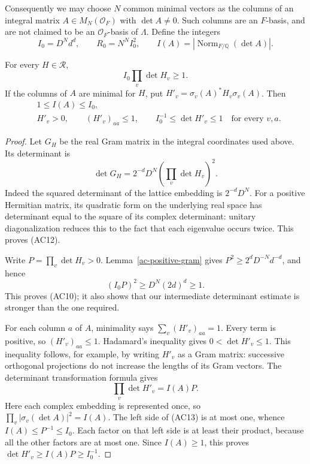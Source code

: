 Consequently we may choose $N$ common minimal vectors as the
columns of an integral matrix $A\in M_N(\mathcal O_F)$ with
$\det A\ne0$.  Such columns are an $F$-basis, and are not
claimed to be an $\mathcal O_F$-basis of $\Lambda$.
Define the integers
\[
       I_0=D^N d^d,\qquad R_0=N^N I_0^2,\qquad
       I(A)=|\operatorname{Norm}_{F/\mathbb Q}(\det A)|.
       \tag{AC9}
\]

\begin{lemma}\label{ac-det}
For every $H\in\mathcal R$,
\[
                  I_0\prod_v\det H_v\ge1.
                  \tag{AC10}
\]
If the columns of $A$ are minimal for $H$, put
$H'_v=\sigma_v(A)^*H_v\sigma_v(A)$.  Then
\[
 \begin{split}
 &1\le I(A)\le I_0,\\
 &H'_v>0,\qquad (H'_v)_{aa}\le1,\qquad
                I_0^{-1}\le\det H'_v\le1
                   \quad\text{for every }v,a.
 \end{split}
 \tag{AC11}
\]
\end{lemma}
\begin{proof}
Let $G_H$ be the real Gram matrix in the integral coordinates
used above.  Its determinant is
\[
       \det G_H=2^{-d}D^N\left(\prod_v\det H_v\right)^2.
       \tag{AC12}
\]
Indeed the squared determinant of the lattice embedding is
$2^{-d}D^N$.  For a positive Hermitian matrix, its quadratic
form on the underlying real space has determinant equal to
the square of its complex determinant: unitary diagonalization
reduces this to the fact that each eigenvalue occurs twice.
This proves (AC12).

Write $P=\prod_v\det H_v>0$.
Lemma~\ref{ac-positive-gram} gives
$P^2\ge 2^dD^{-N}d^{-d}$, and hence
\[
                       (I_0P)^2\ge D^N(2d)^d\ge1.
\]
This proves (AC10); it also shows that our intermediate
determinant estimate is stronger than the one required.

For each column $a$ of $A$, minimality says
$\sum_v(H'_v)_{aa}=1$.  Every term is positive, so
$(H'_v)_{aa}\le1$.  Hadamard's inequality gives
$0<\det H'_v\le1$.  This inequality follows, for example,
by writing $H'_v$ as a Gram matrix: successive orthogonal
projections do not increase the lengths of its Gram vectors.
The determinant transformation formula gives
\[
                  \prod_v\det H'_v=I(A)P.
                  \tag{AC13}
\]
Here each complex embedding is represented once, so
$\prod_v|\sigma_v(\det A)|^2=I(A)$.
The left side of (AC13) is at most one, whence
$I(A)\le P^{-1}\le I_0$.
Each factor on that left side is at least their product,
because all the other factors are at most one.  Since
$I(A)\ge1$, this proves
$\det H'_v\ge I(A)P\ge I_0^{-1}$.
\end{proof}

